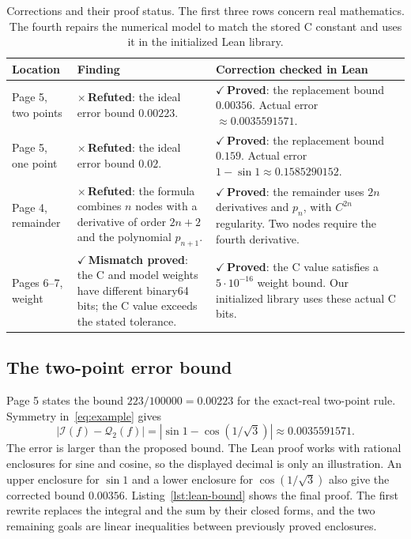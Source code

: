 \documentclass[11pt]{article}
\newcommand{\checked}[1]{\textcolor{provedcolor}{\ensuremath{\checkmark}\,\textbf{#1}}}
\newcommand{\proved}{\checked{Proved}}
\newcommand{\refuted}{\textcolor{refutedcolor}{\ensuremath{\times}\,\textbf{Refuted}}}
\newcommand{\I}{\mathcal{I}}
\newcommand{\Q}{\mathcal{Q}}
\begin{document}
\begin{table}[htbp]
\centering
\small
\renewcommand{\arraystretch}{1.15}
\begin{tabularx}{\textwidth}{@{}>{\raggedright\arraybackslash}p{2cm}YY@{}}
\toprule
{}
Location & Finding & Correction checked in Lean\\
\midrule
Page 5, two points &
\refuted{}: the ideal error bound $0.00223$. &
\proved{}: the replacement bound $0.00356$.
Actual error $\approx0.0035591571$.\\
\addlinespace
Page 5, one point &
\refuted{}: the ideal error bound $0.02$. &
\proved{}: the replacement bound $0.159$.
Actual error $1-\sin1\approx0.1585290152$.\\
\addlinespace
Page 4, remainder &
\refuted{}: the formula combines $n$ nodes with a derivative of order
$2n+2$ and the polynomial $p_{n+1}$. &
\proved{}: the remainder uses $2n$ derivatives and $p_n$,
with $C^{2n}$ regularity. Two nodes require the fourth derivative.\\
\addlinespace
Pages 6--7, weight &
\checked{Mismatch proved}: the C and model weights have different binary64
bits; the C value exceeds the stated tolerance. &
\proved{}: the C value satisfies a $5\cdot10^{-16}$ weight bound.
Our initialized library uses these actual C bits.\\
\bottomrule
\end{tabularx}
\caption{Corrections and their proof status. The first three rows concern
real mathematics. The fourth repairs the numerical model to match the
stored C constant and uses it in the initialized Lean library.}
\label{tab:corrections}
\end{table}

\subsection{The two-point error bound}

Page 5 states the bound $223/100000=0.00223$ for the exact-real two-point
rule. Symmetry in~\eqref{eq:example} gives
\[
 |\I(f)-\Q_2(f)|
  =|\sin1-\cos(1/\sqrt3)|
  \approx0.0035591571.
\]
The error is larger than the proposed bound. The Lean proof works with rational
enclosures for sine and cosine, so the displayed decimal is only an
illustration. An upper enclosure for $\sin1$ and a lower enclosure for
$\cos(1/\sqrt3)$ also give the corrected bound $0.00356$.
Listing~\ref{lst:lean-bound} shows the final proof. The first rewrite
replaces the integral and the sum by their closed forms, and the two
remaining goals are linear inequalities between previously proved
enclosures.
\end{document}
